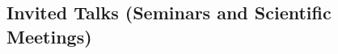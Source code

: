 \documentclass[11pt,letterpaper,pdf]{article}
\newcommand{\mycon}[1]{\smallskip\begin{enumerate}[resume,label={\scriptsize \arabic*$\ $},leftmargin=\parindent]\setlength{\itemsep}{#1}\vspace*{-0.7em}}
\newcommand{\talk}[4]{%
  \item #1. (#2) {\it #3} (#4).}
\begin{document}
\subsection*{Invited Talks (Seminars and Scientific Meetings)}


%
%
%
%
%
%
%
%
%
%
%
%
%
%
%
\end{document}
